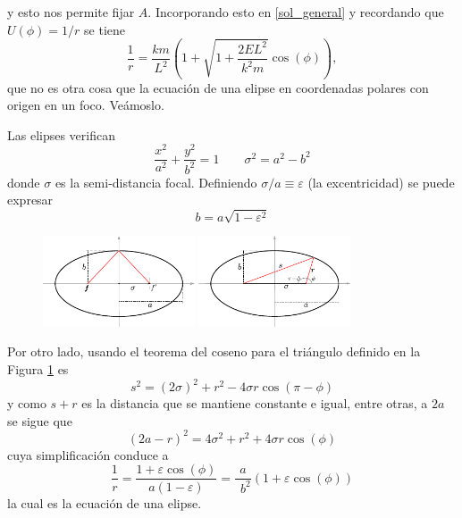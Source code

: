 \documentclass[10pt,oneside]{CBFT_book}
\begin{document}
y esto nos permite fijar $A$. Incorporando esto en \eqref{sol_general} y recordando que $U(\phi) =1/r$ 
se tiene 
\[
	\frac{1}{r} = \frac{km}{L^2}\left( 1 +  \sqrt{1 + \frac{2EL^2}{k^2 m} } \cos( \phi ) \right),
\]
que no es otra cosa que la ecuación de una elipse en coordenadas polares con origen en un foco.
Veámoslo.


Las elipses verifican 
\[
	\frac{x^2}{a^2} + \frac{y^2}{b^2} = 1	\qquad \sigma^2 = a^2 - b^2
\]
donde $\sigma$ es la semi-distancia focal. Definiendo $ \sigma/a \equiv \varepsilon$ (la excentricidad) 
se puede expresar
\[
	b = a \sqrt{ 1 - \varepsilon^2 }
\]
\begin{figure}[hbt]
	\begin{center}
	\includegraphics[width=0.4\textwidth]{images/fig_mc_elipse_1.pdf} \hspace*{2em}	 
	\includegraphics[width=0.4\textwidth]{images/fig_mc_elipse.pdf}	 
	\end{center}
	\caption{}
	\label{fig_mc_elipse}
\end{figure} 

Por otro lado, usando el teorema del coseno para el triángulo definido en la Figura \ref{fig_mc_elipse} es 
\[
	s^2 = (2\sigma)^2 + r^2 - 4\sigma r \cos( \pi - \phi )
\]
y como $s+r$ es la distancia que se mantiene constante e igual, entre otras, a $2a$ se sigue que 
\[
	( 2a -r )^2 = 4\sigma^2 + r^2 + 4\sigma r \cos(\phi)
\]
cuya simplificación conduce a
\[
	\frac{1}{r} = \frac{1 + \varepsilon \cos (\phi)}{a(1-\varepsilon)} = \frac{a}{\phantom{^a}b^2} \left( 1 + 
\varepsilon \cos (\phi) \right)
\]
la cual es la ecuación de una elipse.
\end{document}
